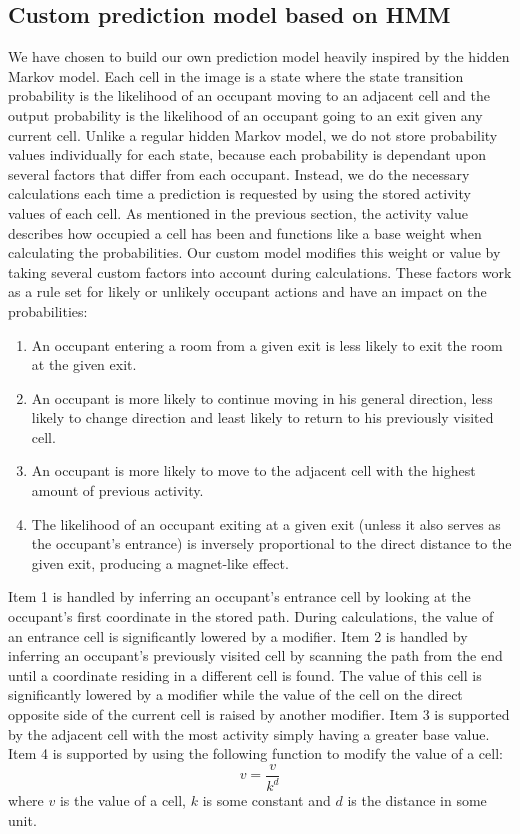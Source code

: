 \subsection{Custom prediction model based on HMM}
\label{ssub:designcustomprediction}
We have chosen to build our own prediction model heavily inspired by the hidden Markov model. Each cell in the image is a state where the state transition probability is the likelihood of an occupant moving to an adjacent cell and the output probability is the likelihood of an occupant going to an exit given any current cell. Unlike a regular hidden Markov model, we do not store probability values individually for each state, because each probability is dependant upon several factors that differ from each occupant. Instead, we do the necessary calculations each time a prediction is requested by using the stored activity values of each cell. As mentioned in the previous section, the activity value describes how occupied a cell has been and functions like a base weight when calculating the probabilities. Our custom model modifies this weight or value by taking several custom factors into account during calculations. These factors work as a rule set for likely or unlikely occupant actions and have an impact on the probabilities:
\begin{enumerate}
\item An occupant entering a room from a given exit is less likely to exit the room at the given exit.
\item An occupant is more likely to continue moving in his general direction, less likely to change direction and least likely to return to his previously visited cell.
\item An occupant is more likely to move to the adjacent cell with the highest amount of previous activity.
\item The likelihood of an occupant exiting at a given exit (unless it also serves as the occupant's entrance) is inversely proportional to the direct distance to the given exit, producing a magnet-like effect.
\end{enumerate}
Item 1 is handled by inferring an occupant's entrance cell by looking at the occupant's first coordinate in the stored path. During calculations, the value of an entrance cell is significantly lowered by a modifier. Item 2 is handled by inferring an occupant's previously visited cell by scanning the path from the end until a coordinate residing in a different cell is found. The value of this cell is significantly lowered by a modifier while the value of the cell on the direct opposite side of the current cell is raised by another modifier. Item 3 is supported by the adjacent cell with the most activity simply having a greater base value. Item 4 is supported by using the following function to modify the value of a cell: 
\begin{equation}
v = \frac{v}{k^d}
\end{equation}
where \(v\) is the value of a cell, \(k\) is some constant and \(d\) is the distance in some unit. 

